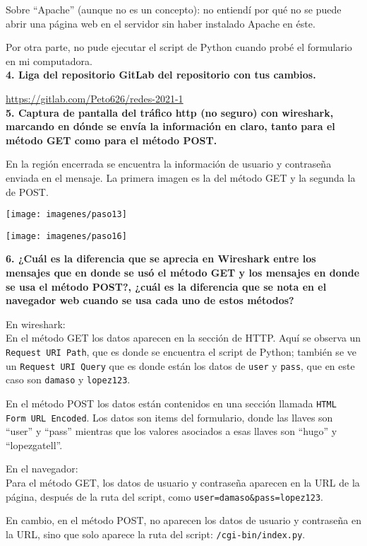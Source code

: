 \documentclass{article}
\begin{document}
Sobre ``Apache'' (aunque no es un concepto): no entiendí por qué no se puede abrir una página web en el servidor sin haber instalado Apache en éste.

Por otra parte, no pude ejecutar el script de Python cuando probé el formulario en mi computadora.\\

\textbf{4. Liga del repositorio GitLab del repositorio con tus cambios.}

\url{https://gitlab.com/Peto626/redes-2021-1}\\

\textbf{5. Captura de pantalla del tráfico http (no seguro) con wireshark, marcando en dónde se envía la información en claro, tanto para el método GET como para el método POST.}

En la región encerrada se encuentra la información de usuario y contraseña enviada en el mensaje. La primera imagen es la del método GET y la segunda la de POST.

\texttt{[image: imagenes/paso13]}

\texttt{[image: imagenes/paso16]}

\textbf{6. ¿Cuál es la diferencia que se aprecia en Wireshark entre los mensajes que en donde se usó el método GET y los mensajes en donde se usa el método POST?, ¿cuál es la diferencia que se nota en el navegador web cuando se usa cada uno de estos métodos?}

En wireshark:\\En el método GET los datos aparecen en la sección de HTTP. Aquí se observa un \texttt{Request URI Path}, que es donde se encuentra el script de Python; también se ve un \texttt{Request URI Query} que es donde están los datos de \texttt{user} y \texttt{pass}, que en este caso son \texttt{damaso} y \texttt{lopez123}.

En el método POST los datos están contenidos en una sección llamada \texttt{HTML Form URL Encoded}. Los datos son items del formulario, donde las llaves son ``user'' y ``pass'' mientras que los valores asociados a esas llaves son ``hugo'' y ``lopezgatell''.

En el navegador:\\
Para el método GET, los datos de usuario y contraseña aparecen en la URL de la página, después de la ruta del script, como \texttt{user=damaso\&pass=lopez123}.

En cambio, en el método POST, no aparecen los datos de usuario y contraseña en la URL, sino que solo aparece la ruta del script: \texttt{/cgi-bin/index.py}.
\end{document}
